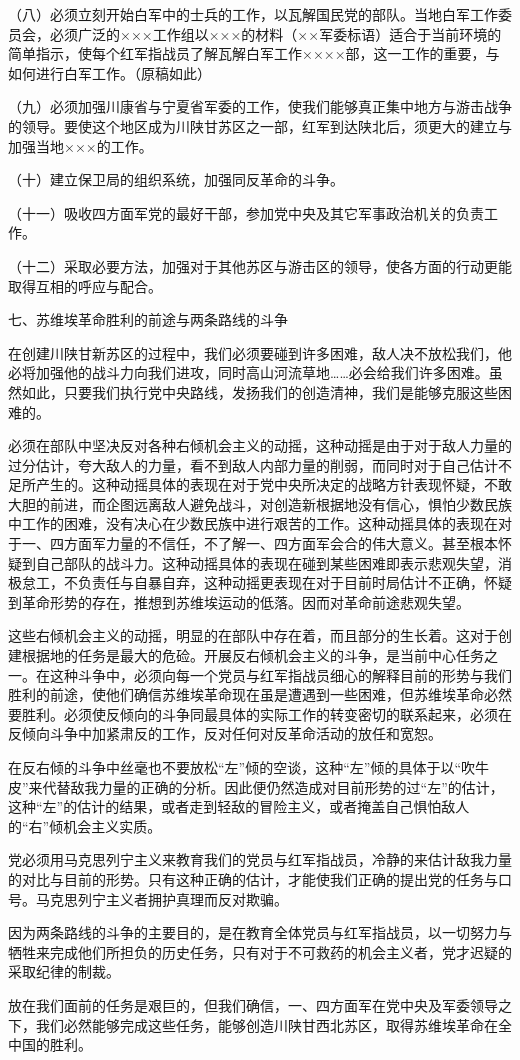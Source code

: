（八）必须立刻开始白军中的士兵的工作，以瓦解国民党的部队。当地白军工作委员会，必须广泛的×××工作组以×××的材料（××军委标语）适合于当前环境的简单指示，使每个红军指战员了解瓦解白军工作××××部，这一工作的重要，与如何进行白军工作。（原稿如此）

（九）必须加强川康省与宁夏省军委的工作，使我们能够真正集中地方与游击战争的领导。要使这个地区成为川陕甘苏区之一部，红军到达陕北后，须更大的建立与加强当地×××的工作。

（十）建立保卫局的组织系统，加强同反革命的斗争。

（十一）吸收四方面军党的最好干部，参加党中央及其它军事政治机关的负责工作。

（十二）采取必要方法，加强对于其他苏区与游击区的领导，使各方面的行动更能取得互相的呼应与配合。

七、苏维埃革命胜利的前途与两条路线的斗争

在创建川陕甘新苏区的过程中，我们必须要碰到许多困难，敌人决不放松我们，他必将加强他的战斗力向我们进攻，同时高山河流草地……必会给我们许多困难。虽然如此，只要我们执行党中央路线，发扬我们的创造清神，我们是能够克服这些困难的。

必须在部队中坚决反对各种右倾机会主义的动摇，这种动摇是由于对于敌人力量的过分估计，夸大敌人的力量，看不到敌人内部力量的削弱，而同时对于自己估计不足所产生的。这种动摇具体的表现在对于党中央所决定的战略方针表现怀疑，不敢大胆的前进，而企图远离敌人避免战斗，对创造新根据地没有信心，惧怕少数民族中工作的困难，没有决心在少数民族中进行艰苦的工作。这种动摇具体的表现在对于一、四方面军力量的不信任，不了解一、四方面军会合的伟大意义。甚至根本怀疑到自己部队的战斗力。这种动摇具体的表现在碰到某些困难即表示悲观失望，消极怠工，不负责任与自暴自弃，这种动摇更表现在对于目前时局估计不正确，怀疑到革命形势的存在，推想到苏维埃运动的低落。因而对革命前途悲观失望。

这些右倾机会主义的动摇，明显的在部队中存在着，而且部分的生长着。这对于创建根据地的任务是最大的危硷。开展反右倾机会主义的斗争，是当前中心任务之一。在这种斗争中，必须向每一个党员与红军指战员细心的解释目前的形势与我们胜利的前途，使他们确信苏维埃革命现在虽是遭遇到一些困难，但苏维埃革命必然要胜利。必须使反倾向的斗争同最具体的实际工作的转变密切的联系起来，必须在反倾向斗争中加紧肃反的工作，反对任何对反革命活动的放任和宽恕。

在反右倾的斗争中丝毫也不要放松“左”倾的空谈，这种“左”倾的具体于以“吹牛皮”来代替敌我力量的正确的分析。因此便仍然造成对目前形势的过“左”的估计，这种“左”的估计的结果，或者走到轻敌的冒险主义，或者掩盖自己惧怕敌人的“右”倾机会主义实质。

党必须用马克思列宁主义来教育我们的党员与红军指战员，冷静的来估计敌我力量的对比与目前的形势。只有这种正确的估计，才能使我们正确的提出党的任务与口号。马克思列宁主义者拥护真理而反对欺骗。

因为两条路线的斗争的主要目的，是在教育全体党员与红军指战员，以一切努力与牺牲来完成他们所担负的历史任务，只有对于不可救药的机会主义者，党才迟疑的采取纪律的制裁。

放在我们面前的任务是艰巨的，但我们确信，一、四方面军在党中央及军委领导之下，我们必然能够完成这些任务，能够创造川陕甘西北苏区，取得苏维埃革命在全中国的胜利。

